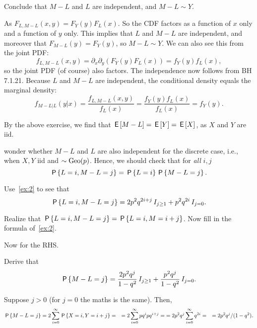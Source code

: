 \begin{exercise}
Conclude that $M-L$ and $L$ are independent, and $M-L\sim Y$.
\begin{solution}
As  $F_{L,M-L}(x,y) = F_Y(y) F_L(x)$. So the CDF factors as a function of $x$ only and a function of $y$ only. This implies that $L$ and $M-L$ are independent, and moreover that $F_{M-L}(y) =  F_Y(y)$, so $M-L \sim Y$. We can also see this from the joint PDF:
\begin{equation*}
f_{L, M-L}(x,y) = \partial_x \partial_y (F_Y(y) F_L(x)) = f_Y(y) f_L(x),
\end{equation*}
so the joint PDF (of course) also factors. The independence now follows from BH 7.1.21.
Because $L$ and $M-L$ are independent, the conditional density equals the marginal density:
\begin{equation*}
f_{M-L|L}(y|x) = \frac{f_{L, M-L}(x, y)}{f_L(x)} = \frac{f_Y(y) f_L(x)}{f_L(x)} = f_Y(y).
\end{equation*}
\end{solution}
\end{exercise}

By the  above exercise, we find that $\E{M-L} = \E Y = \E X$, as $X$ and $Y$ are iid.


 wonder whether $M-L$ and $L$ are also independent for the discrete case, i.e.,  when  $X, Y$ iid and $\sim \Geo{p}$.
Hence, we should check that for \emph{all} $i, j$
\begin{equation}\label{eq:34}
\P{L=i, M-L=j} = \P{L=i} \P{M-L=j}.
\end{equation}


\begin{exercise}
Use~\cref{ex:2} to see that
\begin{equation*}
\P{L=i, M-L=j} = 2p^2q^{2i+j} \1{j\geq 1} + p^2q^{2i}\1{j=0}.
\end{equation*}
\begin{hint}
Realize that $\P{L=i, M-L=j}=  \P{L=i, M=i+j}$. Now fill in the formula of~\cref{ex:2}.
\end{hint}
\end{exercise}

Now for the RHS.
\begin{exercise}
Derive that
\begin{equation*}
\P{M-L=j} = \frac{2p^2q^{j}}{1-q^2}\1{j\geq 1} + \frac{p^2q^{j}}{1-q^2}\1{j=0}.
\end{equation*}
\begin{solution}
Suppose $j>0$ (for $j=0$ the maths is the same). Then,
\begin{align*}
  \P{M-L=j}
&=2\sum_{i=0}^{\infty}\P{X =i, Y=i+j } =
&=2\sum_{i=0}^{\infty}p q^i pq^{i+j} =
&=2p^{2}q^{j}\sum_{i=0}^{\infty}q^{2i} =
&=2p^{2}q^{j}/(1-q^2).
\end{align*}
\end{solution}
\end{exercise}


